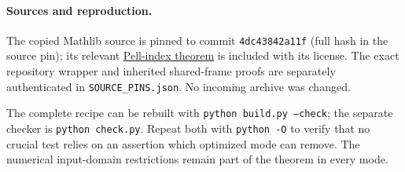 \paragraph{Sources and reproduction.}
The copied Mathlib source is pinned to commit
\texttt{4dc43842a11f} (full hash in the source pin); its relevant
\href{https://github.com/leanprover-community/mathlib4/blob/4dc43842a11f257ffba2a611c943a133a65cb4b2/Mathlib/NumberTheory/PellMatiyasevic.lean}{Pell-index theorem}
is included with its license. The exact repository wrapper and inherited
shared-frame proofs are separately authenticated in
\texttt{SOURCE\_PINS.json}. No incoming archive was changed.

The complete recipe can be rebuilt with \texttt{python build.py --check};
the separate checker is \texttt{python check.py}. Repeat both with
\texttt{python -O} to verify that no crucial test relies on an assertion
which optimized mode can remove. The numerical input-domain restrictions
remain part of the theorem in every mode.
